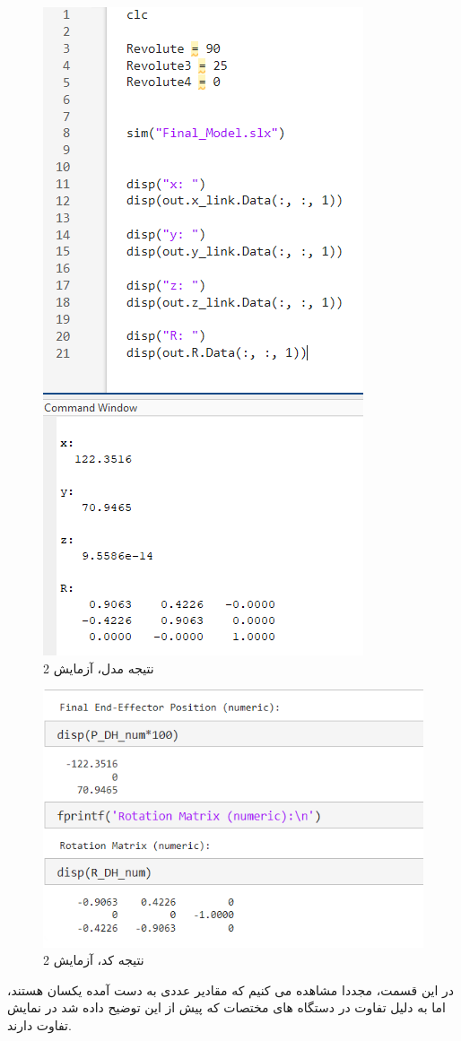 \documentclass{article}
\begin{document}
\begin{figure}[H]
    \centering
    \includegraphics[width=0.5\linewidth]{result2.PNG}
    \caption{نتیجه مدل، آزمایش 2}
    \label{fig:fig:result2}
\end{figure}

\begin{figure}[H]
    \centering
    \includegraphics[width=0.5\linewidth]{result2_screen.png}
    \caption{نتیجه کد، آزمایش 2}
    \label{fig:enter-label}
\end{figure}

در این قسمت، مجددا مشاهده می کنیم که مقادیر عددی به دست آمده یکسان هستند، اما به دلیل تفاوت در دستگاه های مختصات که پیش از این توضیح داده شد در نمایش تفاوت دارند.
\end{document}
